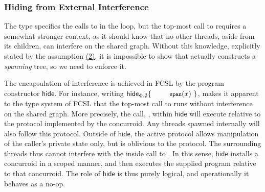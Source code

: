 

\subsubsection{Hiding from External Interference}
\label{sec:restr-extern-interf}
%
The type  specifies the calls to  in the
loop, but the top-most call to  requires a somewhat
stronger context, as it should know that no other threads, aside from
its children, can interfere on the shared graph. Without this
knowledge, explicitly stated by the assumption \hyperlink{asm2}{(2)},
it is impossible to show that  actually constructs a
\emph{spanning} tree, so we need to enforce it.

The encapsulation of interference is achieved in FCSL by the program
constructor $\mathsf{hide}$. For instance, writing
%
$\mathsf{hide}_{\Phi, \emptyset}\{~\esc{span}(x)~\}$,
%
makes it apparent to the type system of FCSL that the top-most call to
 runs without interference on the shared graph.  More
precisely, the call, , within $\mathsf{hide}$ will
execute relative to the protocol implemented by the 
concurroid. Any threads spawned internally will also follow this
protocol.  Outside of $\mathsf{hide}$, the active protocol allows
manipulation of the caller's private state only, but is oblivious to
the  protocol. The surrounding threads thus cannot
interfere with the inside call to . In this sense,
$\mathsf{hide}$ installs a concurroid in a scoped manner, and then
executes the supplied program relative to that concurroid. The role of
$\mathsf{hide}$ is thus purely logical, and operationally it behaves
as a no-op.

